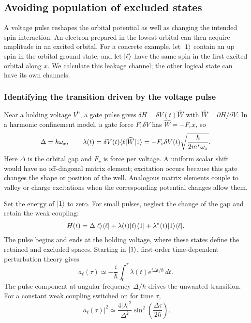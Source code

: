 \subsection{Avoiding population of excluded states}

A voltage pulse reshapes the orbital potential as well as changing
the intended spin interaction. An electron prepared in the lowest
orbital can then acquire amplitude in an excited orbital.
For a concrete example, let $\lvert 1\rangle$ contain an up spin in the
orbital ground state, and let $\lvert \ell\rangle$ have the same spin in
the first excited orbital along $x$. We calculate this leakage
channel; the other logical state can have its own channels.

\subsubsection{Identifying the transition driven by the voltage pulse}
Near a holding voltage $V^0$, a gate pulse gives
$\delta H=\delta V(t)\widehat W$ with
$\widehat W=\partial H/\partial V$.
In a harmonic confinement model, a gate force $F_v\delta V$
has $\widehat W=-F_v x$, so
\[
 \Delta=\hbar\omega_x,\qquad
 \lambda(t)=\delta V(t)\langle \ell\rvert\widehat W\lvert 1\rangle
       =-F_v\delta V(t)\sqrt{\frac{\hbar}{2m^*\omega_x}}.
\]
Here $\Delta$ is the orbital gap and $F_v$ is force per voltage.
A uniform scalar shift would have no off-diagonal matrix element;
excitation occurs because this gate changes the shape or position
of the well. Analogous matrix elements couple to valley or charge
excitations when the corresponding potential changes allow them.

Set the energy of $\lvert 1\rangle$ to zero. For small pulses, neglect the
change of the gap and retain the weak coupling:
\begin{equation}
 H(t)=\Delta\ket\ell\bra\ell+
      \lambda(t)\ket\ell\bra1+\lambda^*(t)\ket1\bra\ell.
 \label{eq:calibration-leakage-model}
\end{equation}
The pulse begins and ends at the holding voltage, where these
states define the retained and excluded spaces. Starting in
$\lvert 1\rangle$, first-order time-dependent perturbation theory gives
\begin{equation}
 a_\ell(\tau)\simeq
 -\frac{i}{\hbar}\int_0^\tau
       \lambda(t)e^{i\Delta t/\hbar}\,dt.
 \label{eq:calibration-leakage-amplitude}
\end{equation}
The pulse component at angular frequency $\Delta/\hbar$ drives
the unwanted transition. For a constant weak coupling switched
on for time $\tau$,
\[
 |a_\ell(\tau)|^2\simeq
 \frac{4|\lambda|^2}{\Delta^2}
 \sin^2\!\left(\frac{\Delta\tau}{2\hbar}\right).
\]
